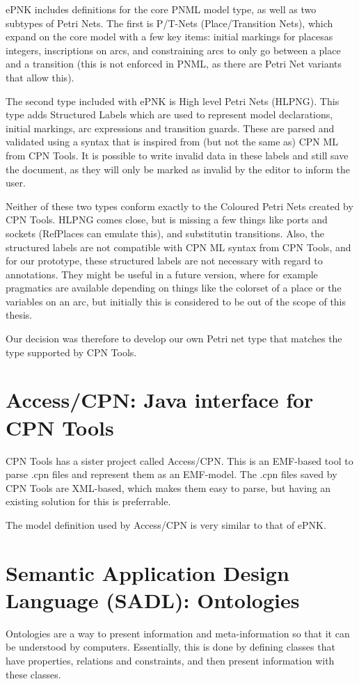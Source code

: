 ePNK includes definitions for the core PNML model type, as well as two
subtypes of Petri Nets. The first is P/T-Nets (Place/Transition Nets), which
expand on the core model with a few key items: initial markings for placesas
integers, inscriptions on arcs, and constraining arcs to only go between a place
and a transition (this is not enforced in PNML, as there are Petri Net variants that
allow this). 

The second type included with ePNK is High level Petri Nets (HLPNG). This type
adds Structured Labels which are used to represent model declarations, initial
markings, arc expressions and transition guards.
These are parsed and validated using a syntax that is inspired from (but not the
same as) CPN ML from CPN Tools. It is possible to write invalid data in these
labels and still save the document, as they will only be marked as invalid by
the editor to inform the user.

Neither of these two types conform exactly to the Coloured Petri Nets created by
CPN Tools. HLPNG comes close, but is missing a few things like ports and sockets
(RefPlaces can emulate this), and substitutin transitions. Also, the
structured labels are not compatible with CPN ML syntax from CPN Tools, and for
our prototype, these structured labels are not necessary with regard to
annotations. They might be useful in a future version, where for example
pragmatics are available depending on things like the colorset of a place or the
variables on an arc, but initially this is considered to be out of the scope of
this thesis.

Our decision was therefore to develop our own Petri net type that matches the
type supported by CPN Tools.

\section{Access/CPN: Java interface for CPN Tools}
CPN Tools has a sister project called Access/CPN. This is an
EMF-based tool to parse .cpn files and represent them as an
EMF-model. The .cpn files saved by CPN Tools are XML-based, which makes them
easy to parse, but having an existing solution for this is preferrable.

The model definition used by Access/CPN is very similar to that of ePNK.



\section{Semantic Application Design Language (SADL): Ontologies}
Ontologies are a way to present information and meta-information so that it can
be understood by computers. Essentially, this is done by defining classes that
have properties, relations and constraints, and then present
information with these classes.


